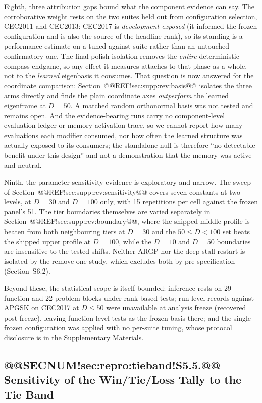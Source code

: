 \documentclass[10pt,a4paper]{article}
\newcommand{\apgsk}{APGSK}
\begin{document}
Eighth, three attribution gaps bound what the component evidence can say.
The corroborative weight rests on the two suites held out from
configuration selection, CEC2011 and CEC2013: CEC2017 is
\emph{development-exposed} (it
informed the frozen configuration and is also the source of the headline
rank), so its standing is a performance estimate on a tuned-against
suite rather than an untouched confirmatory one. The
final-polish isolation removes the \emph{entire} deterministic compass
endgame, so any effect it measures attaches to that phase as a whole, not to the
\emph{learned} eigenbasis it consumes.  That question is now answered for the
coordinate comparison: Section~@@REF!sec:supp:rev:basis@@ isolates the three arms
directly and finds the plain coordinate axes \emph{outperform} the learned
eigenframe at $D = 50$.  A matched random orthonormal basis was not tested and
remains open. And the evidence-bearing runs carry no
component-level evaluation ledger or memory-activation trace, so we cannot
report how many evaluations each modifier consumed, nor how often the
learned structure was actually exposed to its consumers; the standalone
null is therefore ``no detectable benefit under this design'' and not a
demonstration that the memory was active and neutral.

Ninth, the parameter-sensitivity evidence is exploratory and narrow.  The
sweep of Section~@@REF!sec:supp:rev:sensitivity@@ covers seven constants at two
levels, at $D = 30$ and $D = 100$ only, with 15 repetitions per cell against the
frozen panel's 51.  The tier boundaries themselves are varied separately in
Section~@@REF!sec:supp:rev:boundary@@, where the shipped middle profile is beaten
from both neighbouring tiers at $D = 30$ and the $50 \leq D < 100$ set beats the
shipped upper profile at $D = 100$, while the $D = 10$ and $D = 50$ boundaries are
insensitive to the tested shifts.  Neither ARGP nor the deep-stall
restart is isolated by the remove-one study, which excludes both by
pre-specification (Section~S6.2).

Beyond these, the statistical scope is itself bounded: inference rests
on 29-function and 22-problem blocks under rank-based tests; run-level
records against \apgsk{} on CEC2017 at $D \leq 50$ were unavailable at
analysis freeze (recovered post-freeze), leaving
function-level tests as the frozen basis there; and the single frozen
configuration was applied with no
per-suite tuning, whose protocol disclosure is in the Supplementary
Materials. 

\subsection{@@SECNUM!sec:repro:tieband!S5.5.@@ Sensitivity of the Win/Tie/Loss Tally to the Tie Band}\label{sec:repro:tieband}
\end{document}

